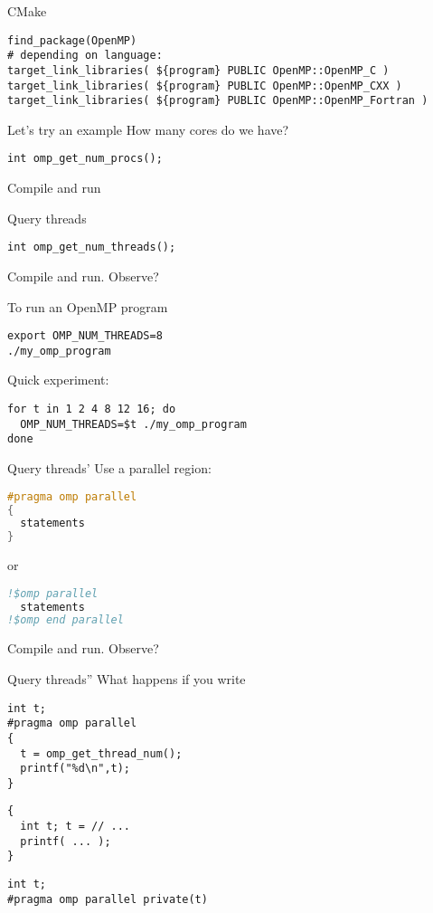 \begin{numberedframe}{CMake}
\begin{lstlisting}
find_package(OpenMP)
# depending on language:
target_link_libraries( ${program} PUBLIC OpenMP::OpenMP_C )
target_link_libraries( ${program} PUBLIC OpenMP::OpenMP_CXX )
target_link_libraries( ${program} PUBLIC OpenMP::OpenMP_Fortran )
\end{lstlisting}
\end{numberedframe}

\begin{numberedframe}{Let's try an example}
  How many cores do we have?
\begin{lstlisting}
int omp_get_num_procs();
\end{lstlisting}
Compile and run
\end{numberedframe}

\begin{numberedframe}{Query threads}
\begin{lstlisting}
int omp_get_num_threads();
\end{lstlisting}
Compile and run. Observe?
\end{numberedframe}

\begin{numberedframe}{To run an OpenMP program}
\begin{verbatim}
export OMP_NUM_THREADS=8
./my_omp_program
\end{verbatim}
Quick experiment:
\begin{verbatim}
for t in 1 2 4 8 12 16; do
  OMP_NUM_THREADS=$t ./my_omp_program
done
\end{verbatim}
\end{numberedframe}

\begin{numberedframe}{Query threads'}
Use a parallel region:
\begin{lstlisting}[language=C]
#pragma omp parallel
{
  statements
}
\end{lstlisting}
or
\begin{lstlisting}[language=Fortran]
!$omp parallel
  statements
!$omp end parallel
\end{lstlisting}
Compile and run. Observe?
\end{numberedframe}

\begin{numberedframe}{Query threads''}
What happens if you write
\begin{lstlisting}
int t;
#pragma omp parallel
{
  t = omp_get_thread_num();
  printf("%d\n",t);
}
\end{lstlisting}
\begin{multicols}{2}
\begin{lstlisting}
{
  int t; t = // ...
  printf( ... );
}
\end{lstlisting}
\columnbreak
\begin{lstlisting}
int t;
#pragma omp parallel private(t)
\end{lstlisting}
\end{multicols}
\end{numberedframe}

